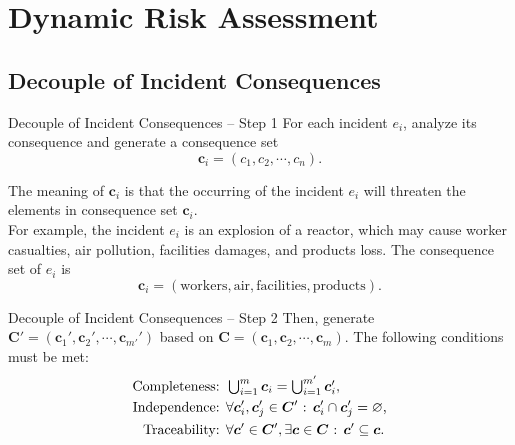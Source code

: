 \label{Section: Dynamic Risk Assessment}
\section{Dynamic Risk Assessment}
\subsection{Decouple of Incident Consequences}
\begin{frame}{Decouple of Incident Consequences -- Step 1}
    \label{Dynamic Risk Assessment: Decouple of Incident Consequences Step 1}
    For each incident $e_i$, analyze its consequence and generate a consequence set
    \[
        \bm{c}_i = (c_1, c_2, \cdots, c_n) \text{.}
    \]

    The meaning of $\bm{c}_i$ is that the occurring of the incident $e_i$ will threaten the elements in consequence set $\bm{c}_i$.\\[10pt]

    For example, the incident $e_i$ is an explosion of a reactor, which may cause worker casualties, air pollution, facilities damages, and products loss. The consequence set of $e_i$ is
    \[
    \bm{c}_i = (\text{workers}, \text{air}, \text{facilities}, \text{products})\text{.}
    \]
\end{frame}

\begin{frame}{Decouple of Incident Consequences -- Step 2}
    \label<trans:1>{Dynamic Risk Assessment: Decouple of Incident Consequences Step 2 Conditions}
    \label<trans:2>{Dynamic Risk Assessment: Decouple of Incident Consequences Step 2 Example}
    Then, generate $\bm{C}' = (\bm{c}_1',\bm{c}_2',\cdots,\bm{c}_{m'}')$ based on $\bm{C} = (\bm{c}_1, \bm{c}_2, \cdots, \bm{c}_m)$. The following conditions must be met:
    \begin{align}
        \text{Completeness: } & \textstyle\bigcup_{i=1}^m \bm{c}_i= \bigcup_{i=1}^{m'} \bm{c}_i'\text{,}\notag\\
        \text{Independence: } & \forall \bm{c}_i',\bm{c}_j' \in \bm{C}' \text{ : } \bm{c}_i' \cap \bm{c}_j' = \varnothing\text{,}\notag\\
        \text{Traceability: } & \forall \bm{c}' \in \bm{C}', \exists \bm{c} \in \bm{C} \text{ : } \bm{c}' \subseteq \bm{c}\text{.}\notag
    \end{align}
    \vspace{-30pt}

\end{frame}

